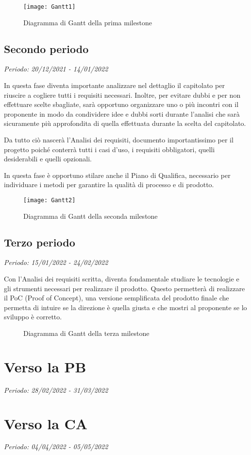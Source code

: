 \begin{figure}[!ht]
    \texttt{[image: Gantt1]}
    \caption{Diagramma di Gantt della prima milestone} 
\end{figure}

\subsection{Secondo periodo}

\textit{Periodo: 20/12/2021 - 14/01/2022}

In questa fase diventa importante analizzare nel dettaglio il capitolato per riuscire a
cogliere tutti i requisiti necessari. Inoltre, per evitare dubbi e per non effettuare
scelte sbagliate, sarà opportuno organizzare uno o più incontri con il proponente in modo da
condividere idee e dubbi sorti durante l'analisi che sarà sicuramente più approfondita di quella
effettuata durante la scelta del capitolato.
\par Da tutto ciò nascerà l'Analisi dei requisiti, documento importantissimo per il progetto poiché
conterrà tutti i casi d'uso, i requisiti obbligatori, quelli desiderabili e quelli opzionali.
\par In questa fase è opportuno stilare anche il Piano di Qualifica, necessario per individuare
i metodi per garantire la qualità di processo e di prodotto.

\begin{figure}[!ht]
    \texttt{[image: Gantt2]}
    \caption{Diagramma di Gantt della seconda milestone} 
\end{figure}

\subsection{Terzo periodo}

\textit{Periodo: 15/01/2022 - 24/02/2022}

Con l'Analisi dei requisiti scritta, diventa fondamentale studiare le tecnologie e gli strumenti necessari
per realizzare il prodotto. Questo permetterà di realizzare il PoC (Proof of Concept), una versione semplificata 
del prodotto finale che permetta di intuire se la direzione è quella giusta e che mostri al proponente se lo 
sviluppo è corretto.

\begin{figure}[!ht]
    \caption{Diagramma di Gantt della terza milestone} 
\end{figure}

\section{Verso la PB}

\textit{Periodo: 28/02/2022 - 31/03/2022}

\section{Verso la CA}

\textit{Periodo: 04/04/2022 - 05/05/2022}